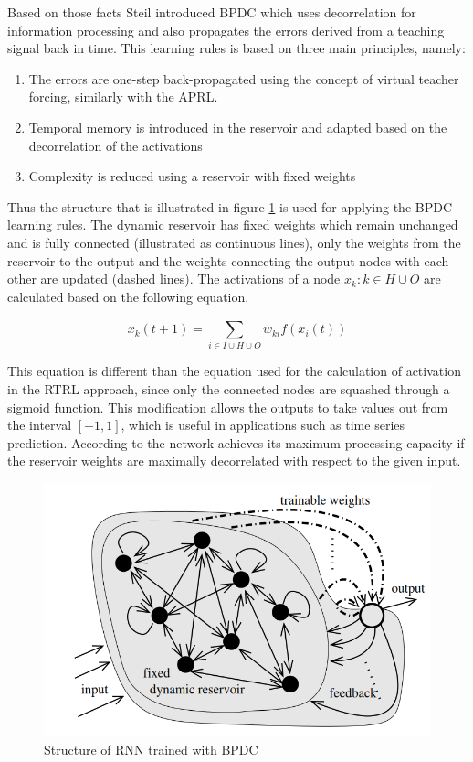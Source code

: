 \documentclass[msc,ai,logo]{infthesis}
\begin{document}
Based on those facts Steil introduced BPDC which uses decorrelation for information processing and also propagates the errors derived from a teaching signal back in time. This learning rules is based on three main principles, namely:
\begin{enumerate}
\item The errors are one-step back-propagated using the concept of virtual teacher forcing, similarly with the APRL.
\item Temporal memory is introduced in the reservoir and adapted based on the decorrelation of the activations
\item Complexity is reduced using a reservoir with fixed weights 
\end{enumerate}
Thus the structure that is illustrated in figure \ref{fig:BPDC} is used for applying the BPDC learning rules. The dynamic reservoir has fixed weights which remain unchanged and is fully connected (illustrated as continuous lines), only the weights from the reservoir to the output and the weights connecting the output nodes with each other are updated (dashed lines). The activations of a node $x_k: k \in H \cup O$ are calculated based on the following equation.  

\begin{equation}
\label{eq:BPac}
{x_k}(t + 1) = \sum\limits_{i \in I \cup H \cup O}^{} {w_{ki}}{f({x_i(t)})} 
\end{equation}
 
This equation is different than the equation used for the calculation of activation in the RTRL approach, since only the connected nodes are squashed through a sigmoid function. This modification allows the outputs to take values out from the interval $[-1,1]$, which is useful in applications such as time series prediction. According to \cite{Steil} the network achieves its maximum processing capacity if the reservoir weights are maximally decorrelated with respect to the given input.    
 \begin{figure}[H]
\includegraphics[scale=0.3]{BPDC.png}
\centering
\caption{Structure of RNN trained with BPDC \citep{Steil}}
\label{fig:BPDC}
\end{figure}    
     
\end{document}
